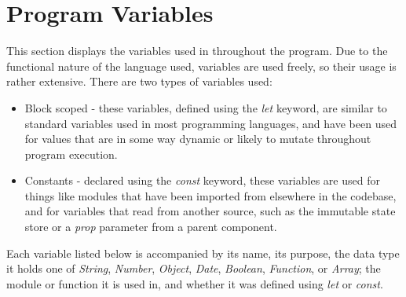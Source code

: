 \clearpage
\section{Program Variables}
This section displays the variables used in throughout the program. Due to the functional nature of the language used, variables are used freely, so their usage is rather extensive. There are two types of variables used:

\begin{itemize}
  \item Block scoped - these variables, defined using the \textit{let} keyword, are similar to standard variables used in most programming languages, and have been used for values that are in some way dynamic or likely to mutate throughout program execution.
  \item Constants - declared using the \textit{const} keyword, these variables are used for things like modules that have been imported from elsewhere in the codebase, and for variables that read from another source, such as the immutable state store or a \textit{prop} parameter from a parent component.
\end{itemize}

Each variable listed below is accompanied by its name, its purpose, the data type it holds one of \textit{String}, \textit{Number}, \textit{Object}, \textit{Date}, \textit{Boolean}, \textit{Function}, or \textit{Array}; the module or function it is used in, and whether it was defined using \textit{let} or \textit{const}.

